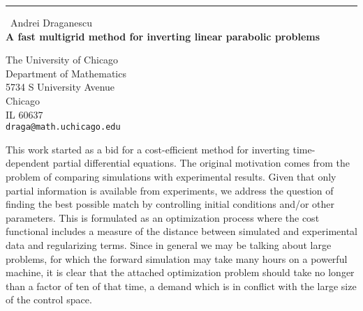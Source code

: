 \documentclass{report}
\begin{document}
\begin{center}
\rule{6in}{1pt} \
{\large Andrei Draganescu \\
{\bf A fast multigrid method for inverting linear parabolic problems}}

The University of Chicago \\ Department of Mathematics \\ 5734 S University Avenue \\ Chicago \\ IL 60637
\\
{\tt draga@math.uchicago.edu}\end{center}

This work started as a bid for a cost-efficient method for inverting
time-dependent partial differential equations. The original motivation
comes from the problem of comparing simulations with experimental
results. Given that only partial information is available from
experiments, we address the question of finding the best possible
match by controlling initial conditions and/or other parameters. This is
formulated as an optimization process where the cost functional
includes a measure of the distance between simulated and experimental
data and regularizing terms. Since in general we may be talking about
large problems, for which the forward simulation may take many hours
on a powerful machine, it is clear that the attached optimization
problem should take no longer than a factor of ten of that time, a
demand which is in conflict with the large size of the control space.
\end{document}
